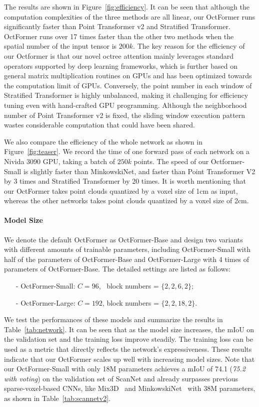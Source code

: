 \documentclass[acmtog,screen,authorversion]{acmart}
\begin{document}
The results are shown in Figure~\ref{fig:efficiency}.
It can be seen that although the computation complexities of the three methods are all linear, our OctFormer runs significantly faster than  Point Transformer v2 and Stratified Transformer.
OctFormer runs over 17 times faster than the other two methods when the spatial number of the input tensor is $200k$.
The key reason for the efficiency of our Octformer is that our novel octree attention mainly leverages standard operators supported by deep learning frameworks, which is further based on general matrix multiplication routines on GPUs and has been optimized towards the computation limit of GPUs. Conversely, the point number in each window of Stratified Transformer is highly unbalanced, making it challenging for efficiency tuning even with hand-crafted GPU programming.
Although the neighborhood number of Point Transformer v2 is fixed, the sliding window execution pattern wastes considerable computation that could have been shared.


We also compare the efficiency of the whole network as shown in Figure~\ref{fig:teaser}.
We record the time of one forward pass of each network on a Nivida 3090 GPU, taking a batch of $250k$ points.
The speed of our Octformer-Small is slightly faster than MinkowskiNet, and faster than Point Transformer V2 by 3 times and Stratified Transformer by  20 times.
It is worth mentioning that our OctFormer takes point clouds quantized by a voxel size of 1cm as input, whereas the other networks takes point clouds quantized by a voxel size of 2cm.






\paragraph{Model Size}
We denote the default OctFormer as OctFormer-Base and design two variants with different amounts of trainable parameters, including OctFormer-Small with half of the parameters of OctFormer-Base and OctFormer-Large with 4 times of parameters of OctFormer-Base.
The detailed settings are listed as follows:
\begin{itemize}[leftmargin=16pt,itemsep=2pt]
  \item[-] OctFormer-Small: $C=96$, \, block numbers =  $\{2, 2, 6, 2\}$;
  \item[-] OctFormer-Large: $C=192$, block numbers = $\{2, 2, 18, 2\}$.
\end{itemize}
We test the performances of these models and summarize the results in Table~\ref{tab:network}.
It can be seen that as the model size increases, the mIoU on the validation set and the training loss improve steadily.
The training loss can be used as a metric that directly reflects the network's expressiveness.
These results indicate that our OctFormer scales up well with increasing model sizes.
Note that our OctFormer-Small with only 18M parameters achieves a mIoU of 74.1 (\emph{75.2 with voting}) on the validation set of ScanNet and already surpasses previous sparse-voxel-based CNNs, like Mix3D~\cite{Nekrasov2021} and MinkowskiNet~\cite{Choy2019} with 38M parameters, as shown in Table~\ref{tab:scannetv2}.
\end{document}
